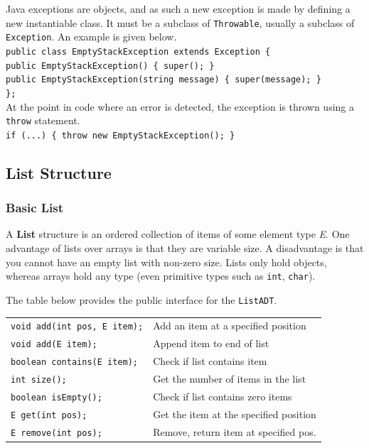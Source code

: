 Java exceptions are objects, and as such a new exception is made by defining a new instantiable class. It must be a subclass of \texttt{Throwable}, usually a subclass of \texttt{Exception}. An example is given below. \\

\texttt{public class EmptyStackException extends Exception \{} \\
\indent \indent \texttt{public EmptyStackException() \{ super(); \}} \\
\indent \indent \texttt{public EmptyStackException(string message) \{ super(message); \}} \\
\indent \texttt{\};} \\


At the point in code where an error is detected, the exception is thrown using a \texttt{throw} statement. \\

\texttt{if (...) \{ throw new EmptyStackException(); \}} \\

\subsection{List Structure}
\subsubsection{Basic List}
A \textbf{List} structure is an ordered collection of items of some element type \textit{E}. One advantage of lists over arrays is that they are variable size. A disadvantage is that you cannot have an empty list with non-zero size. Lists only hold objects, whereas arrays hold any type (even primitive types such as \texttt{int}, \texttt{char}). 

The table below provides the public interface for the \texttt{ListADT}. \\

\begin{tabular}{p{}p{}}
\texttt{void add(int pos, E item);} & Add an item at a specified position \\
\texttt{void add(E item);} & Append item to end of list \\
\texttt{boolean contains(E item);} & Check if list contains item \\
\texttt{int size();} & Get the number of items in the list \\ 
\texttt{boolean isEmpty();} & Check if list contains zero items \\
\texttt{E get(int pos);} & Get the item at the specified position \\
\texttt{E remove(int pos);} & Remove, return item at specified pos. \\
\end{tabular} \\

